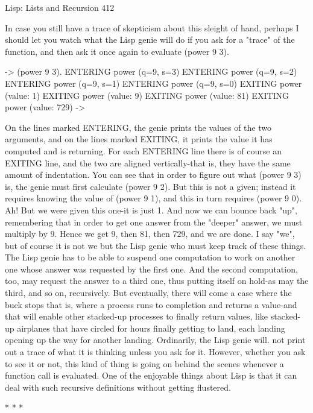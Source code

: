 Lisp: Lists and Recursion                                                             412

       In case you still have a trace of skepticism about this sleight of hand, perhaps I
should let you watch what the Lisp genie will do if you ask for a "trace" of the
function, and then ask it once again to evaluate (power 9 3).

-> (power 9 3).
   ENTERING power (q=9, s=3)
    ENTERING power (q=9, s=2)
      ENTERING power (q=9, s=1)
       ENTERING power (q=9, s=0)
       EXITING power (value: 1)
     EXITING power (value: 9)
   EXITING power (value: 81)
EXITING power (value: 729)
->

On the lines marked ENTERING, the genie prints the values of the two arguments,
and on the lines marked EXITING, it prints the value it has computed and is
returning. For each ENTERING line there is of course an EXITING line, and the
two are aligned vertically-that is, they have the same amount of indentation.
        You can see that in order to figure out what (power 9 3) is, the genie must first
calculate (power 9 2). But this is not a given; instead it requires knowing the value of
(power 9 1), and this in turn requires (power 9 0). Ah! But we were given this one-it
is just 1. And now we can bounce back "up", remembering that in order to get one
answer from the "deeper" answer, we must multiply by 9. Hence we get 9, then 81,
then 729, and we are done.
        I say "we", but of course it is not we but the Lisp genie who must keep track of
these things. The Lisp genie has to be able to suspend one computation to work on
another one whose answer was requested by the first one. And the second
computation, too, may request the answer to a third one, thus putting itself on hold-as
may the third, and so on, recursively. But eventually, there will come a case where the
buck stops that is, where a process runs to completion and returns a value-and that
will enable other stacked-up processes to finally return values, like stacked-up
airplanes that have circled for hours finally getting to land, each landing opening up
the way for another landing.
        Ordinarily, the Lisp genie will. not print out a trace of what it is thinking
unless you ask for it. However, whether you ask to see it or not, this kind of thing is
going on behind the scenes whenever a function call is evaluated. One of the
enjoyable things about Lisp is that it can deal with such recursive definitions without
getting flustered.

                                       *   *   *




